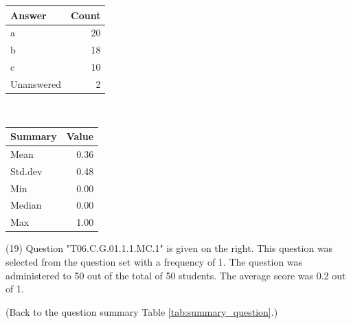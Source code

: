 \documentclass[12pt,english,nohyper]{tufte-handout}\usepackage[]{graphicx}\usepackage[]{color}
\begin{document}
\begin{center}%
\begin{tabular}{lr}
  \hline
Answer & Count \\ 
  \hline
a &  20 \\ 
  b &  18 \\ 
  c &  10 \\ 
  Unanswered &   2 \\ 
   \hline
\end{tabular}
~~~~~~~~%
\begin{tabular}{lr}
  \hline
Summary & Value \\ 
  \hline
Mean & 0.36 \\ 
  Std.dev & 0.48 \\ 
  Min & 0.00 \\ 
  Median & 0.00 \\ 
  Max & 1.00 \\ 
   \hline
\end{tabular}
\end{center}\newpage{} (19) Question "T06.C.G.01.1.1.MC.1" is given on the right. This question was selected from the question set with a frequency of 1. The question was administered to 50 out of the total of 50 students. The average score was 0.2 out of 1.

 (Back to the question summary Table \ref{tab:summary_question}.)
\end{document}
